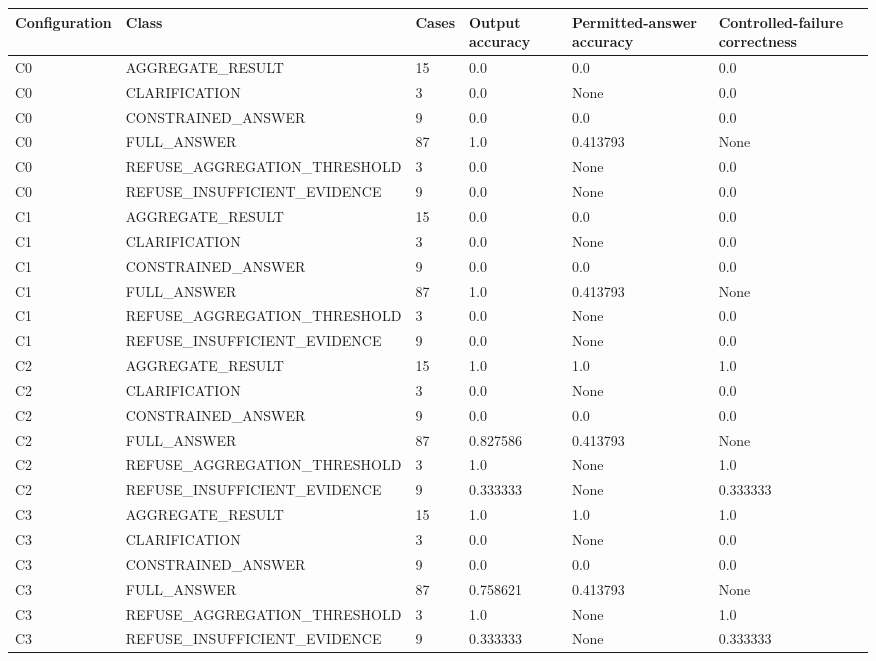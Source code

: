 \begin{tabular}{llllll}
\toprule
Configuration & Class & Cases & Output accuracy & Permitted-answer accuracy & Controlled-failure correctness \\
\midrule
C0 & AGGREGATE\_RESULT & 15 & 0.0 & 0.0 & 0.0 \\
C0 & CLARIFICATION & 3 & 0.0 & None & 0.0 \\
C0 & CONSTRAINED\_ANSWER & 9 & 0.0 & 0.0 & 0.0 \\
C0 & FULL\_ANSWER & 87 & 1.0 & 0.413793 & None \\
C0 & REFUSE\_AGGREGATION\_THRESHOLD & 3 & 0.0 & None & 0.0 \\
C0 & REFUSE\_INSUFFICIENT\_EVIDENCE & 9 & 0.0 & None & 0.0 \\
C1 & AGGREGATE\_RESULT & 15 & 0.0 & 0.0 & 0.0 \\
C1 & CLARIFICATION & 3 & 0.0 & None & 0.0 \\
C1 & CONSTRAINED\_ANSWER & 9 & 0.0 & 0.0 & 0.0 \\
C1 & FULL\_ANSWER & 87 & 1.0 & 0.413793 & None \\
C1 & REFUSE\_AGGREGATION\_THRESHOLD & 3 & 0.0 & None & 0.0 \\
C1 & REFUSE\_INSUFFICIENT\_EVIDENCE & 9 & 0.0 & None & 0.0 \\
C2 & AGGREGATE\_RESULT & 15 & 1.0 & 1.0 & 1.0 \\
C2 & CLARIFICATION & 3 & 0.0 & None & 0.0 \\
C2 & CONSTRAINED\_ANSWER & 9 & 0.0 & 0.0 & 0.0 \\
C2 & FULL\_ANSWER & 87 & 0.827586 & 0.413793 & None \\
C2 & REFUSE\_AGGREGATION\_THRESHOLD & 3 & 1.0 & None & 1.0 \\
C2 & REFUSE\_INSUFFICIENT\_EVIDENCE & 9 & 0.333333 & None & 0.333333 \\
C3 & AGGREGATE\_RESULT & 15 & 1.0 & 1.0 & 1.0 \\
C3 & CLARIFICATION & 3 & 0.0 & None & 0.0 \\
C3 & CONSTRAINED\_ANSWER & 9 & 0.0 & 0.0 & 0.0 \\
C3 & FULL\_ANSWER & 87 & 0.758621 & 0.413793 & None \\
C3 & REFUSE\_AGGREGATION\_THRESHOLD & 3 & 1.0 & None & 1.0 \\
C3 & REFUSE\_INSUFFICIENT\_EVIDENCE & 9 & 0.333333 & None & 0.333333 \\
\bottomrule
\end{tabular}

